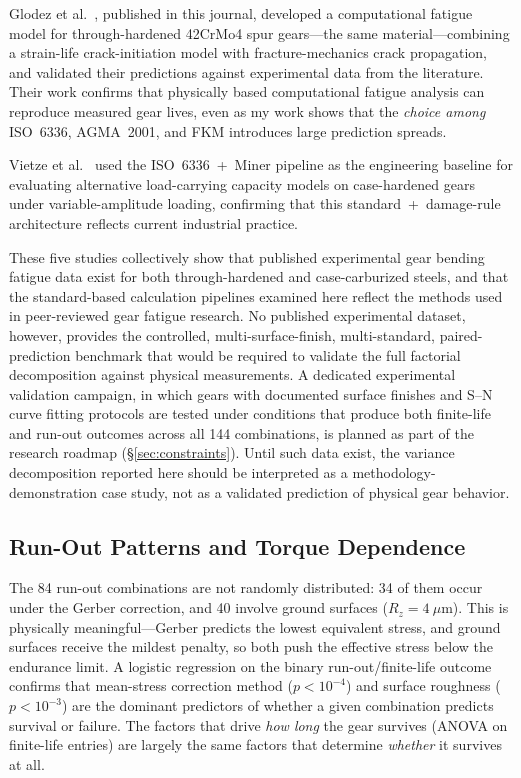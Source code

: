 \documentclass[twocolumn,12pt,a4paper]{article}
\begin{document}
Glodez et al.~\cite{glodez2002}, published in this journal, developed a
computational fatigue model for through-hardened 42CrMo4 spur
gears---the same material---combining a strain-life crack-initiation
model with fracture-mechanics crack propagation, and validated their
predictions against experimental data from the literature. Their work
confirms that physically based computational fatigue analysis can
reproduce measured gear lives, even as my work shows that the
\emph{choice among} ISO~6336, AGMA~2001, and FKM introduces large
prediction spreads.

Vietze et al.~\cite{vietze2024} used the ISO~6336~+~Miner pipeline as
the engineering baseline for evaluating alternative load-carrying
capacity models on case-hardened gears under variable-amplitude
loading, confirming that this standard~+~damage-rule architecture
reflects current industrial practice.

These five studies collectively show that published experimental
gear bending fatigue data exist for both through-hardened and
case-carburized steels, and that the standard-based calculation
pipelines examined here reflect the methods used in peer-reviewed gear
fatigue research. No published experimental dataset, however, provides
the controlled, multi-surface-finish, multi-standard, paired-prediction
benchmark that would be required to validate the full factorial
decomposition against physical measurements. A dedicated experimental
validation campaign, in which gears with documented surface finishes
and S--N curve fitting protocols are tested under conditions that
produce both finite-life and run-out outcomes across all 144
combinations, is planned as part of the research roadmap
(\S\ref{sec:constraints}). Until such data exist, the variance
decomposition reported here should be interpreted as a
methodology-demonstration case study, not as a validated prediction of
physical gear behavior.

\subsection{Run-Out Patterns and Torque Dependence}

The 84 run-out combinations are not randomly distributed: 34 of them
occur under the Gerber correction, and 40 involve ground surfaces
($R_z = 4~\mu$m). This is physically meaningful---Gerber predicts the
lowest equivalent stress, and ground surfaces receive the mildest
penalty, so both push the effective stress below the endurance limit.
A logistic regression on the binary run-out/finite-life outcome
confirms that mean-stress correction method ($p < 10^{-4}$) and
surface roughness ($p < 10^{-3}$) are the dominant predictors of
whether a given combination predicts survival or failure. The factors
that drive \emph{how long} the gear survives (ANOVA on finite-life
entries) are largely the same factors that determine \emph{whether} it
survives at all.
\end{document}
